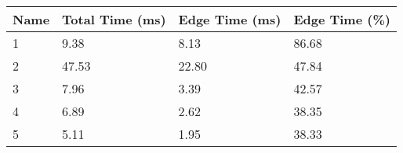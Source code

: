 \begin{tabular}{llll}
\toprule
Name & Total Time (ms) & Edge Time (ms) & Edge Time (\%)\\\midrule
1 & 9.38 & 8.13 & 86.68\\\midrule
2 & 47.53 & 22.80 & 47.84\\\midrule
3 & 7.96 & 3.39 & 42.57\\\midrule
4 & 6.89 & 2.62 & 38.35\\\midrule
5 & 5.11 & 1.95 & 38.33\\\midrule
\bottomrule
\end{tabular}
